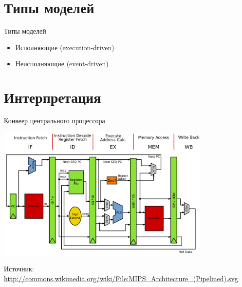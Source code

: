 \documentclass{beamer}
\begin{document}
\section{Типы моделей}

\begin{frame}{Типы моделей}

\begin{itemize}
\item Исполняющие (execution-driven)
\item Неисполняющие (event-driven)

\end{itemize}






\end{frame}

\section{Интерпретация}

\begin{frame}{Конвеер центрального процессора}

\includegraphics[width=0.8\textwidth]{mips-pipeline}

\tiny{Источник: \url{http://commons.wikimedia.org/wiki/File:MIPS_Architecture_(Pipelined).svg}}

\end{frame} 
\end{document}

